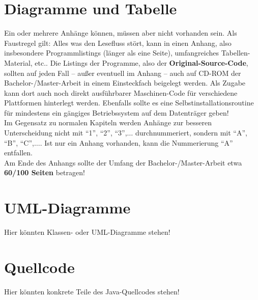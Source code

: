 \chapter{Diagramme und Tabelle}
\label{chap:anhang_a}

Ein oder mehrere Anhänge können, müssen aber nicht vorhanden sein.
Als Faustregel gilt: Alles was den Lesefluss stört, kann in einen
Anhang, also insbesondere Programmlistings (länger als eine Seite),
umfangreiches Tabellen-Material, etc.. Die Listings der Programme,
also der {\bf Original-Source-Code}, 
sollten auf jeden Fall -- außer eventuell im Anhang -- auch auf 
CD-ROM  der Bachelor-/Master-Arbeit in einem Einsteckfach beigelegt
werden. Als Zugabe 
kann dort  auch noch direkt ausführbarer Maschinen-Code für verschiedene
Plattformen hinterlegt  werden. Ebenfalls sollte es eine
Selbstinstallationsroutine für mindestens ein gängiges Betriebssystem auf dem
Datenträger geben! \\ 
Im Gegensatz zu normalen Kapiteln werden Anhänge zur besseren Unterscheidung
nicht mit "`1"', "`2"', "`3"',$\ldots$ durchnummeriert, sondern mit
"`A"', "`B"', "`C"',$\ldots$. Ist nur ein Anhang vorhanden, kann die
Nummerierung "`A"' entfallen. \\[0.2cm]
Am Ende des Anhangs sollte der Umfang der Bachelor-/Master-Arbeit etwa 
{\bf 60/100 Seiten} betragen!

\chapter{UML-Diagramme}
\label{chap:anhang_b}

\begin{center}
Hier könnten Klassen- oder UML-Diagramme stehen!
\end{center}

\chapter{Quellcode}
\label{chap:anhang_c}

\begin{center}
Hier könnten konkrete Teile des Java-Quellcodes stehen!
\end{center}